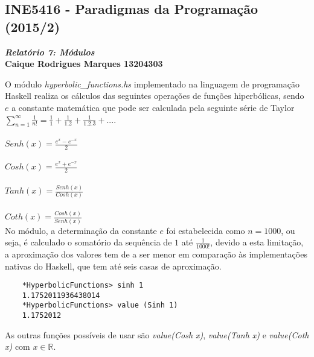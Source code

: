\documentclass{article}
\begin{document}
    \begin{center}
        \section*{INE5416 - Paradigmas da Programação (2015/2)}
        \textbf{\textit{Relatório 7: Módulos} \\
        Caique Rodrigues Marques 13204303}
    \end{center}

O módulo \textit{hyperbolic\_functions.hs} implementado na linguagem de programação Haskell realiza os cálculos das seguintes operações de funções hiperbólicas, sendo $e$ a constante matemática que pode ser calculada pela seguinte série de Taylor $\sum_{n=1}^{\infty}\frac{1}{n!} = \frac{1}{1} + \frac{1}{1.2} + \frac{1}{1.2.3} +...$. \\ \\

\noindent
$Senh(x) = \frac{e^{x} - e^{-x}}{2}$ \\ \\
$Cosh(x) = \frac{e^{x} + e^{-x}}{2}$ \\ \\
$Tanh(x) = \frac{Senh(x)}{Cosh(x)}$ \\ \\
$Coth(x) = \frac{Cosh(x)}{Senh(x)}$ \\
    
No módulo, a determinação da constante $e$ foi estabelecida como $n = 1000$, ou seja, é calculado o somatório da sequência de $1$ até $\frac{1}{1000!}$, devido a esta limitação, a aproximação dos valores tem de a ser menor em comparação às implementações nativas do Haskell, que tem até seis casas de aproximação.

\begin{verbatim}
    *HyperbolicFunctions> sinh 1
    1.1752011936438014
    *HyperbolicFunctions> value (Sinh 1)
    1.1752012
\end{verbatim}

As outras funções possíveis de usar são \textit{value(Cosh x)}, \textit{value(Tanh x)} e \textit{value(Coth x)} com $x \in \mathbb{R}$.
\end{document}
